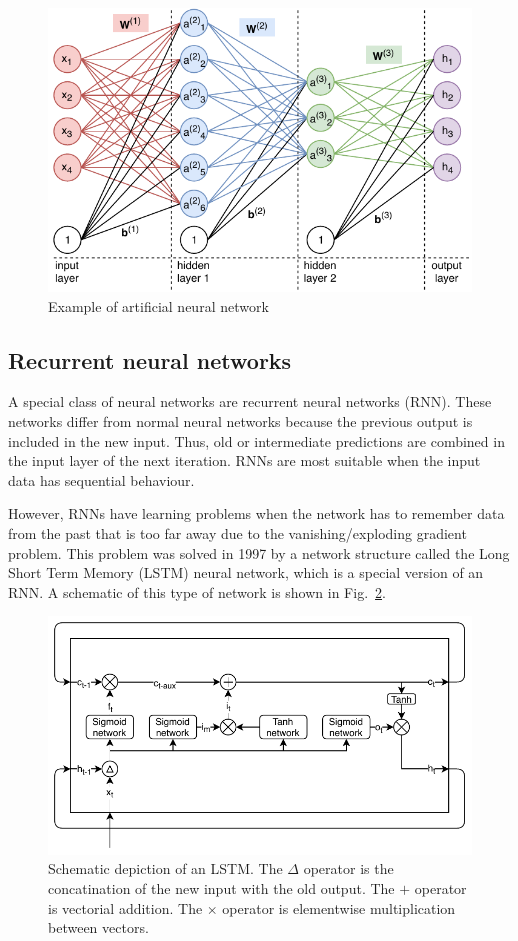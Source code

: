 \documentclass[journal,10pt,twoside, a4paper]{IEEEtran}
\begin{document}
\begin{figure}
    \centering
    \includegraphics[width=0.9\linewidth]{Thesis/images/nn.pdf}
    \caption{Example of artificial neural network}
    \label{fig:nn}
\end{figure}

\subsection{Recurrent neural networks}
A special class of neural networks are recurrent neural networks (RNN). These networks differ from normal neural networks because the previous output is included in the new input. Thus, old or intermediate predictions are combined in the input layer of the next iteration. RNNs are most suitable when the input data has sequential behaviour.

However, RNNs have learning problems when the network has to remember data from the past that is too far away due to the vanishing/exploding gradient problem\cite{lstm}. This problem was solved in 1997 by a network structure called the Long Short Term Memory (LSTM)\cite{lstm} neural network, which is a special version of an RNN. A schematic of this type of network is shown in Fig.~\ref{fig:lstm}.

\begin{figure}
    \centering
    \includegraphics[width=0.9\linewidth]{Thesis/images/lstm.pdf}
    \caption{Schematic depiction of an LSTM. The \textcircled{$\scriptstyle \Delta$} operator is the concatination of the new input with the old output. The \textcircled{$+$} operator is vectorial addition. The \textcircled{$\times$} operator is elementwise multiplication between vectors.}
    \label{fig:lstm}
\end{figure}
\end{document}

